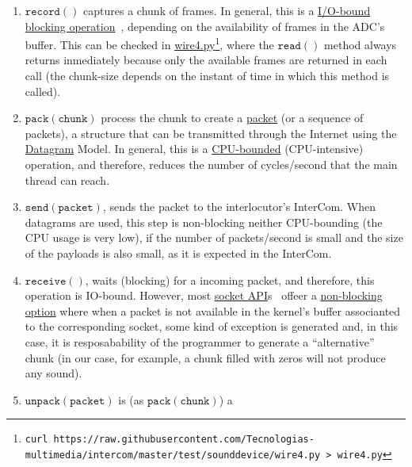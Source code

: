 \begin{enumerate}
\item $\mathtt{record()}$ captures a chunk of frames. In general, this
  is a \href{https://en.wikipedia.org/wiki/I/O_bound}{I/O-bound}
  \href{https://python-sounddevice.readthedocs.io/en/0.4.0/api/streams.html#sounddevice.Stream.read}{blocking
    operation}~\cite{sounddevice}, depending on the availability of
  frames in the ADC's buffer. This can be checked in
  \href{https://raw.githubusercontent.com/Tecnologias-multimedia/intercom/master/test/sounddevice/wire4.py}{wire4.py}\footnote{
    \texttt{curl https://raw.githubusercontent.com/Tecnologias-multimedia/intercom/master/test/sounddevice/wire4.py > wire4.py}
  },
  where the $\mathtt{read()}$ method always returns inmediately
  because only the available frames are returned in each call (the
  chunk-size depends on the instant of time in which this method is
  called).
\item $\mathtt{pack(chunk)}$ process the chunk to create a
  \href{https://en.wikipedia.org/wiki/Network_packet}{packet} (or a
  sequence of packets), a structure that can be transmitted through
  the Internet using the
  \href{https://en.wikipedia.org/wiki/Datagram}{Datagram} Model. In
  general, this is a
  \href{https://en.wikipedia.org/wiki/CPU-bound}{CPU-bounded}
  (CPU-intensive) operation, and therefore, reduces the number of
  cycles/second that the main thread can reach.
\item $\mathtt{send(packet)}$, sends the packet to the interlocutor's
  InterCom. When datagrams are used, this step is non-blocking neither
  CPU-bounding (the CPU usage is very low), if the number of
  packets/second is small and the size of the payloads is also small,
  as it is expected in the InterCom.
\item $\mathtt{receive()}$, waits (blocking) for a incoming packet,
  and therefore, this operation is IO-bound. However, most
  \href{https://docs.python.org/3/library/socket.html}{socket
    API}s~\cite{python} offeer a
  \href{https://docs.python.org/3.8/library/socket.html#socket.socket.setblocking}{non-blocking
    option} where when a packet is not available in the kernel's
  buffer associanted to the corresponding socket, some kind of
  exception is generated and, in this case, it is resposabability of
  the programmer to generate a ``alternative'' chunk (in our case, for
  example, a chunk filled with zeros will not produce any sound).
\item $\mathtt{unpack(packet)}$ is (as $\mathtt{pack(chunk)}$) a

\end{enumerate}

